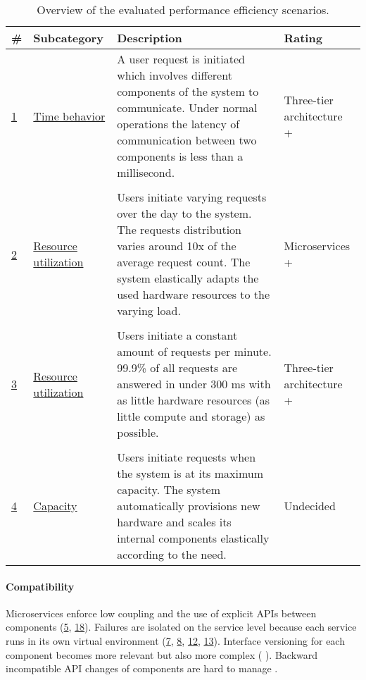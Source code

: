 \begin{table}[H]
  \renewcommand{\arraystretch}{1.2}
  \centering
  \sffamily
  \begin{footnotesize}
    \begin{tabular}{l l p{} p{}}
    \toprule
    \textbf{\#} & \textbf{Subcategory} & \textbf{Description}& \textbf{Rating} \\
    \midrule
    \hyperref[quaMicro:s1]{1} & \hyperref[quaMicro:s1]{Time behavior} & A user request is initiated which involves different components of the system to communicate. Under normal operations the latency of communication between two components is less than a millisecond. & Three-tier architecture + \\  \\
	\hyperref[quaMicro:s2]{2} & \hyperref[quaMicro:s2]{Resource utilization} & Users initiate varying requests over the day to the system. The requests distribution varies around 10x of the average request count. The system elastically adapts the used hardware resources to the varying load. & Microservices + \\ \\
		\hyperref[quaMicro:s3]{3} & \hyperref[quaMicro:s3]{Resource utilization} & Users initiate a constant amount of requests per minute. 99.9\% of all requests are answered in under 300 ms with as little hardware resources (as little compute and storage) as possible. & Three-tier architecture + \\ \\
		\hyperref[quaMicro:s4]{4} & \hyperref[quaMicro:s4]{Capacity} & Users initiate requests when the system is at its maximum capacity. The system automatically provisions new hardware and scales its internal components elastically according to the need. & Undecided \\ 
    \bottomrule
    \end{tabular}
  \end{footnotesize}
  \rmfamily
  \caption[Overview of the evaluated performance efficiency scenarios.]{Overview of the evaluated performance efficiency scenarios.}
  \label{quaMicro:tableOverview}
\end{table}

\paragraph{Compatibility}
\begin{itemize}
\pro Microservices enforce low coupling and the use of explicit \ac{API}s between components (\hyperref[quaMicro:s5]{5}, \hyperref[quaMicro:s18]{18}).
\pro Failures are isolated on the service level because each service runs in its own virtual environment (\hyperref[quaMicro:s7]{7}, \hyperref[quaMicro:s8]{8}, \hyperref[quaMicro:s7]{12}, \hyperref[quaMicro:s7]{13}).
\con Interface versioning for each component becomes more relevant but also more complex (\citep[p. 62ff.]{Newman2015} \citep[8:20]{Saleh2000}).
\con Backward incompatible \ac{API} changes of components are hard to manage \citep[p. 64f.]{Newman2015}.
\end{itemize}

